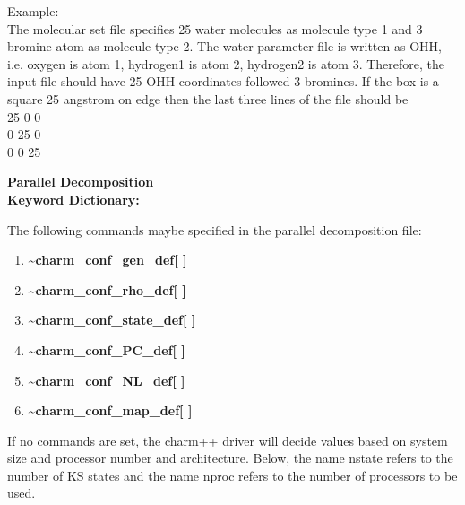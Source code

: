 Example: \\ 
The molecular set file specifies 25 water molecules as molecule
type 1 and 3 bromine atom as molecule type 2. The water parameter file is 
written as OHH, i.e. oxygen is atom 1, hydrogen1 is atom 2, hydrogen2 is 
atom 3. Therefore, the input file should have 25 OHH coordinates followed
3 bromines. If the box is a square 25 angstrom on edge 
then the last three lines of the file should be \\
\hspace*{1.5in}  25  0  0  \\
\hspace*{1.5in}  0  25  0  \\
\hspace*{1.5in}  0  0   25 \\

\clearpage
\begin{center}
\huge
{\bf Parallel Decomposition \\ Keyword Dictionary: } 
\end{center}
\large

The following commands maybe specified in the parallel decomposition file:
\begin{enumerate}
\LARGE
\item {\bf \~{ }charm\_conf\_gen\_def[ ]}
\item {\bf \~{ }charm\_conf\_rho\_def[ ]}
\item {\bf \~{ }charm\_conf\_state\_def[ ]}
\item {\bf \~{ }charm\_conf\_PC\_def[ ]}
\item {\bf \~{ }charm\_conf\_NL\_def[ ]}
\item {\bf \~{ }charm\_conf\_map\_def[ ]}
\end{enumerate}
If no commands are set, the charm++ driver will decide values based
on system size and processor number and architecture. Below, the 
name nstate refers to the number of KS states and the name nproc
refers to the number of processors to be used.

